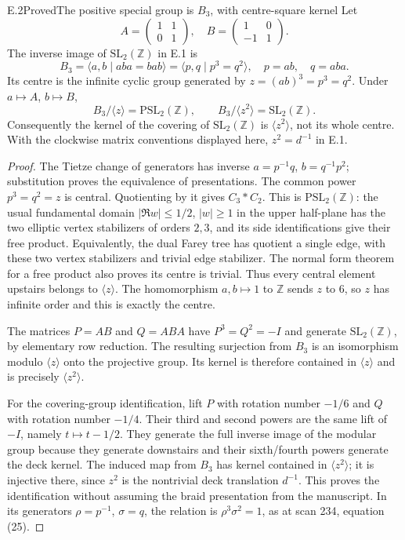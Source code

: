 \begin{statement}{E.2}{Proved}{The positive special group is $B_3$, with centre-square kernel}
Let
\[
 A=\begin{pmatrix}1&1\\0&1\end{pmatrix},\quad
 B=\begin{pmatrix}1&0\\-1&1\end{pmatrix}.
\]
The inverse image of $\mathrm{SL}_2(\mathbb Z)$ in E.1 is
\[
 B_3=\langle a,b\mid aba=bab\rangle
     =\langle p,q\mid p^3=q^2\rangle,
 \quad p=ab,\quad q=aba.
\]
Its centre is the infinite cyclic group generated by
$z=(ab)^3=p^3=q^2$.  Under $a\mapsto A$, $b\mapsto B$,
\[
 B_3/\langle z\rangle=\mathrm{PSL}_2(\mathbb Z),\qquad
 B_3/\langle z^2\rangle=\mathrm{SL}_2(\mathbb Z).
\]
Consequently the kernel of the covering of $\mathrm{SL}_2(\mathbb Z)$
is $\langle z^2\rangle$, not its whole centre.  With the clockwise
matrix conventions displayed here, $z^2=d^{-1}$ in E.1.
\end{statement}
\begin{proof}
The Tietze change of generators has inverse
$a=p^{-1}q$, $b=q^{-1}p^2$; substitution proves the equivalence of
presentations.  The common power $p^3=q^2=z$ is central.  Quotienting
by it gives $C_3*C_2$.  This is $\mathrm{PSL}_2(\mathbb Z)$: the
usual fundamental domain $|\Re w|\leq1/2$, $|w|\geq1$ in the upper
half-plane has the two elliptic vertex stabilizers of orders $2,3$,
and its side identifications give their free product.  Equivalently,
the dual Farey tree has quotient a single edge, with these two vertex
stabilizers and trivial edge stabilizer.  The normal form theorem for
a free product also proves its centre is trivial.  Thus every central
element upstairs belongs to $\langle z\rangle$.  The homomorphism
$a,b\mapsto1$ to $\mathbb Z$ sends $z$ to $6$, so $z$ has infinite
order and this is exactly the centre.

The matrices $P=AB$ and $Q=ABA$ have
$P^3=Q^2=-I$ and generate $\mathrm{SL}_2(\mathbb Z)$, by elementary
row reduction.  The resulting surjection from $B_3$ is an isomorphism
modulo $\langle z\rangle$ onto the projective group.  Its kernel is
therefore contained in $\langle z\rangle$ and is precisely
$\langle z^2\rangle$.

For the covering-group identification, lift $P$ with rotation number
$-1/6$ and $Q$ with rotation number $-1/4$.  Their third and second
powers are the same lift of $-I$, namely $t\mapsto t-1/2$.
They generate the full inverse image of the modular group because
they generate downstairs and their sixth/fourth powers generate the
deck kernel.  The induced map from $B_3$ has kernel contained in
$\langle z^2\rangle$; it is injective there, since $z^2$ is the
nontrivial deck translation $d^{-1}$.  This proves the identification
without assuming the braid presentation from the manuscript.
In its generators $\rho=p^{-1}$, $\sigma=q$, the relation is
$\rho^3\sigma^2=1$, as at scan 234, equation (25).
\end{proof}

